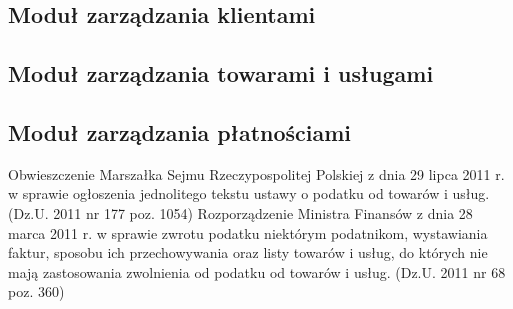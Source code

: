 \subsection{Moduł zarządzania klientami}
\subsection{Moduł zarządzania towarami i usługami}
\subsection{Moduł zarządzania płatnościami}

\newpage
\begin{thebibliography}{szerokosc}
Obwieszczenie Marszałka Sejmu Rzeczypospolitej Polskiej z
dnia 29 lipca 2011 r. w sprawie ogłoszenia jednolitego tekstu ustawy o podatku
od towarów i usług. (Dz.U. 2011 nr 177 poz. 1054) 
Rozporządzenie Ministra Finansów z dnia 28 marca
2011 r.
w sprawie zwrotu podatku niektórym podatnikom, wystawiania faktur, sposobu ich
przechowywania oraz listy towarów i usług, do których nie mają zastosowania
zwolnienia od podatku od towarów i usług. (Dz.U. 2011 nr 68 poz. 360)
\end{thebibliography}

